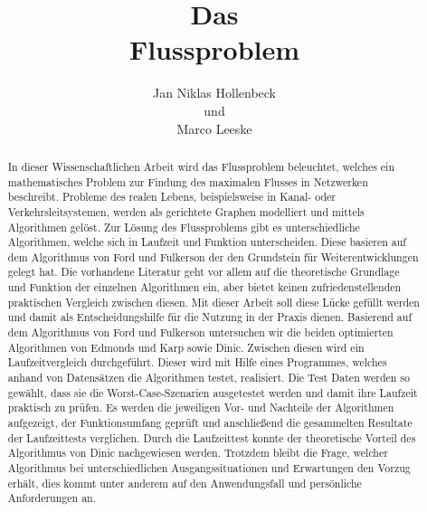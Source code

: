 \documentclass[runningheads,a4paper]{llncs}
\begin{document}
\mainmatter  %

\title{Das \\ Flussproblem}


%
%
\author{Jan Niklas Hollenbeck \\ und \\ Marco Leeske}
\maketitle


\begin{abstract}
In dieser Wissenschaftlichen Arbeit wird das Flussproblem beleuchtet, welches ein mathematisches Problem zur Findung des maximalen Flusses in Netzwerken beschreibt.
 Probleme des realen Lebens, beispielsweise in Kanal- oder Verkehrsleitsystemen, werden als gerichtete Graphen modelliert und mittels Algorithmen gelöst.
 Zur Lösung des Flussproblems gibt es unterschiedliche Algorithmen, welche sich in Laufzeit und Funktion unterscheiden. Diese basieren auf dem Algorithmus von Ford und Fulkerson der den Grundstein für Weiterentwicklungen gelegt hat.
 Die vorhandene Literatur geht vor allem auf die theoretische Grundlage und Funktion der einzelnen Algorithmen ein,  aber bietet keinen zufriedenstellenden praktischen Vergleich zwischen diesen.
 Mit dieser Arbeit soll diese Lücke gefüllt werden und damit als Entscheidungshilfe für die Nutzung in der Praxis dienen.
Basierend auf dem Algorithmus von Ford und Fulkerson untersuchen wir die beiden optimierten Algorithmen von Edmonds und Karp sowie Dinic.
Zwischen diesen wird ein Laufzeitvergleich durchgeführt.
 Dieser wird mit Hilfe eines Programmes, welches anhand von Datensätzen die Algorithmen testet, realisiert.
Die Test Daten werden so gewählt, dass sie die Worst-Case-Szenarien ausgetestet werden und damit ihre Laufzeit praktisch zu prüfen.
Es werden die jeweiligen Vor- und Nachteile der Algorithmen aufgezeigt, der Funktionsumfang geprüft und anschließend die gesammelten Resultate der Laufzeittests verglichen.
Durch die Laufzeittest konnte der theoretische Vorteil des Algorithmus von Dinic nachgewiesen werden.
 Trotzdem bleibt die Frage, welcher Algorithmus bei unterschiedlichen Ausgangssituationen und Erwartungen den Vorzug erhält, dies kommt unter anderem auf den Anwendungsfall und persönliche Anforderungen an.

\end{abstract}
\end{document}
